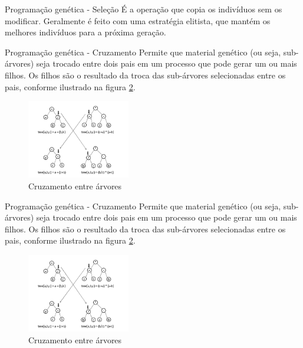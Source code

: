 \documentclass{beamer}
\begin{document}
  \begin{frame}{Programação genética - Seleção}
      É a operação que copia os indivíduos sem os modificar. Geralmente é feito com uma estratégia elitista, que mantém os melhores indivíduos para a próxima geração.
  \end{frame}

  \begin{frame}{Programação genética - Cruzamento}
      Permite que material genético (ou seja, sub-árvores) seja trocado entre dois pais em um processo que pode gerar um ou mais filhos. Os filhos são o resultado da troca das sub-árvores selecionadas entre os pais, conforme ilustrado na figura \ref{fig:crossover}.
      \begin{figure}
          \centering
          \includegraphics[width=0.4\textwidth]{crossover.png}
          \caption{Cruzamento entre árvores \cite{geneticrl}}
          \label{fig:crossover}
      \end{figure}
  \end{frame}

  \begin{frame}{Programação genética - Cruzamento}
      Permite que material genético (ou seja, sub-árvores) seja trocado entre dois pais em um processo que pode gerar um ou mais filhos. Os filhos são o resultado da troca das sub-árvores selecionadas entre os pais, conforme ilustrado na figura \ref{fig:crossover}.
      \begin{figure}
          \centering
          \includegraphics[width=0.4\textwidth]{crossover.png}
          \caption{Cruzamento entre árvores \cite{geneticrl}}
          \label{fig:crossover}
      \end{figure}
  \end{frame}
\end{document}
